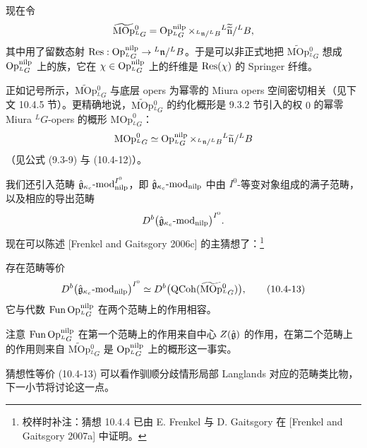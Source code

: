现在令
\[
    \widetilde{\mathrm{MOp}}{}^0_{{}^L G}
    =\operatorname{Op}^{\mathrm{nilp}}_{{}^L G}
    \times_{{}^L\mathfrak{n}/{}^L B}
    {}^{L}\widetilde{\widetilde{\mathrm{n}}}/{}^L B,
\]
其中用了留数态射 $\operatorname{Res}:\operatorname{Op}^{\mathrm{nilp}}_{{}^L G}\to{}^L\mathfrak{n}/{}^L B$。于是可以非正式地把 $\widetilde{\mathrm{MOp}}{}^0_{{}^L G}$ 想成 $\operatorname{Op}^{\mathrm{nilp}}_{{}^L G}$ 上的族，它在 $\chi\in\operatorname{Op}^{\mathrm{nilp}}_{{}^L G}$ 上的纤维是 $\operatorname{Res}(\chi)$ 的 Springer 纤维。

正如记号所示，$\widetilde{\mathrm{MOp}}{}^0_{{}^L G}$ 与底层 opers 为幂零的 Miura opers 空间密切相关（见下文 10.4.5 节）。更精确地说，$\widetilde{\mathrm{MOp}}{}^0_{{}^L G}$ 的约化概形是 9.3.2 节引入的权 $0$ 的幂零 Miura ${}^L G$-opers 的概形 $\mathrm{MOp}^0_{{}^L G}$：
\[
    \mathrm{MOp}^0_{{}^L G}
    \simeq\operatorname{Op}^{\mathrm{nilp}}_{{}^L G}\times_{{}^L\mathfrak{n}/{}^L B}{}^L\widetilde{\mathrm{n}}/{}^L B
\]
（见公式 (9.3-9) 与 (10.4-12)）。

我们还引入范畴 $\hat{\mathfrak{g}}_{\kappa_c}\text{-}\mathrm{mod}_{\mathrm{nilp}}^{I^0}$，即 $\hat{\mathfrak{g}}_{\kappa_c}\text{-}\mathrm{mod}_{\mathrm{nilp}}$ 中由 $I^0$-等变对象组成的满子范畴，以及相应的导出范畴
\[
    D^b\bigl(\hat{\mathfrak{g}}_{\kappa_c}\text{-}\mathrm{mod}_{\mathrm{nilp}}\bigr)^{I^0}.
\]
现在可以陈述 [Frenkel and Gaitsgory 2006c] 的主猜想了：\footnote{校样时补注：猜想 10.4.4 已由 E. Frenkel 与 D. Gaitsgory 在 [Frenkel and Gaitsgory 2007a] 中证明。}

\begin{conjecture}\label{conj:u16-main}
    存在范畴等价
    \begin{equation}
        D^b\bigl(\hat{\mathfrak{g}}_{\kappa_c}\text{-}\mathrm{mod}_{\mathrm{nilp}}\bigr)^{I^0}
        \simeq D^b\bigl(\mathrm{QCoh}(\widetilde{\mathrm{MOp}}{}^0_{{}^L G})\bigr),
        \tag{10.4-13}
    \end{equation}
    它与代数 $\operatorname{Fun}\operatorname{Op}^{\mathrm{nilp}}_{{}^L G}$ 在两个范畴上的作用相容。
\end{conjecture}

注意 $\operatorname{Fun}\operatorname{Op}^{\mathrm{nilp}}_{{}^L G}$ 在第一个范畴上的作用来自中心 $Z(\hat{\mathfrak{g}})$ 的作用，在第二个范畴上的作用则来自 $\widetilde{\mathrm{MOp}}{}^0_{{}^L G}$ 是 $\operatorname{Op}^{\mathrm{nilp}}_{{}^L G}$ 上的概形这一事实。

猜想性等价 (10.4-13) 可以看作驯顺分歧情形局部 Langlands 对应的范畴类比物，下一小节将讨论这一点。

